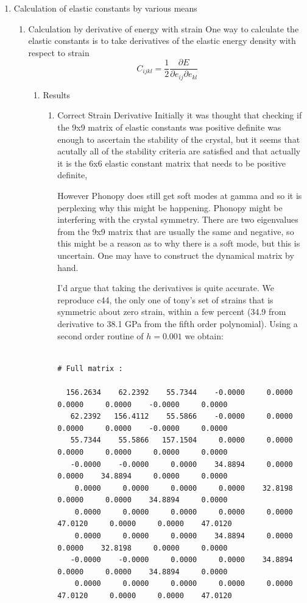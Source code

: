 \documentclass[11pt]{article}
\begin{document}
\begin{enumerate}
\item Calculation of elastic constants by various means
\label{sec:org2b0cc79}
\begin{enumerate}
\item Calculation by derivative of energy with strain
\label{sec:orgf075c8f}
One way to calculate the elastic constants is to take derivatives of the elastic energy density with respect to strain
\[ C_{ijkl} = \frac{1}{2}\frac{\partial E}{ \partial e_{ij} \partial
e_{kl} } \]
\begin{enumerate}
\item Results
\label{sec:org760fe74}
\begin{enumerate}
\item Correct Strain Derivative
\label{sec:org56fd21e}
Initially it was thought that checking if the 9x9 matrix of elastic constants was positive definite was enough
to ascertain the stability of the crystal, but it seems that acutally all of the stability criteria
are satisfied and that actually it is the 6x6 elastic constant matrix that needs to be positive definite,

However Phonopy does still get soft modes at gamma and so it is perplexing why this might be happening. 
Phonopy might be interfering with the crystal symmetry.
There are two eigenvalues from the 9x9 matrix that are usually the same and negative, so this might be a reason
as to why there is a soft mode, but this is uncertain. One may have to construct the dynamical matrix by hand. 

I'd argue that taking the derivatives is quite accurate. We reproduce c44, the only one of tony's set of strains
that is symmetric about zero strain, within a few percent (34.9 from derivative to 38.1 GPa from the fifth order polynomial).
Using a second order routine of \(h=0.001\) we obtain:
\begin{verbatim}

# Full matrix :

  156.2634    62.2392    55.7344    -0.0000     0.0000     0.0000     0.0000    -0.0000     0.0000
   62.2392   156.4112    55.5866    -0.0000     0.0000     0.0000     0.0000    -0.0000     0.0000
   55.7344    55.5866   157.1504     0.0000     0.0000     0.0000     0.0000     0.0000     0.0000
   -0.0000    -0.0000     0.0000    34.8894     0.0000     0.0000    34.8894     0.0000     0.0000
    0.0000     0.0000     0.0000     0.0000    32.8198     0.0000     0.0000    34.8894     0.0000
    0.0000     0.0000     0.0000     0.0000     0.0000    47.0120     0.0000     0.0000    47.0120
    0.0000     0.0000     0.0000    34.8894     0.0000     0.0000    32.8198     0.0000     0.0000
   -0.0000    -0.0000     0.0000     0.0000    34.8894     0.0000     0.0000    34.8894     0.0000
    0.0000     0.0000     0.0000     0.0000     0.0000    47.0120     0.0000     0.0000    47.0120


\end{verbatim}
\end{enumerate}
\end{enumerate}
\end{enumerate}
\end{enumerate}
\end{document}
